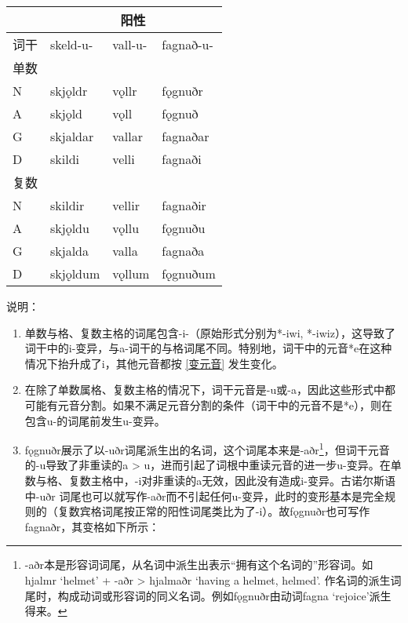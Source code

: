 \begin{longtable}{llll}
  \toprule
     & \multicolumn{3}{c}{\textbf{阳性}}                       \\
  \midrule
  \endhead
  \bottomrule
  \endfoot
  词干 & skeld-u-                        & vall-u- & fagnað-u- \\
  单数 &                                 &         &           \\
  N  & skjǫldr                         & vǫllr   & fǫgnuðr   \\
  A  & skjǫld                          & vǫll    & fǫgnuð    \\
  G  & skjaldar                        & vallar  & fagnaðar  \\
  D  & skildi                          & velli   & fagnaði   \\
  复数 &                                 &         &           \\
  N  & skildir                         & vellir  & fagnaðir  \\
  A  & skjǫldu                         & vǫllu   & fǫgnuðu   \\
  G  & skjalda                         & valla   & fagnaða   \\
  D  & skjǫldum                        & vǫllum  & fǫgnuðum  \\
\end{longtable}

说明：

\begin{enumerate}
  \item
        单数与格、复数主格的词尾包含-i-（原始形式分别为*-iwi, *-iwiz），这导致了词干中的i-变异，与a-词干的与格词尾不同。特别地，词干中的元音*e在这种情况下抬升成了i，其他元音都按 \ref{变元音} 发生变化。
  \item
        在除了单数属格、复数主格的情况下，词干元音是-u或-a，因此这些形式中都可能有元音分割。如果不满足元音分割的条件（词干中的元音不是*e），则在包含u-的词尾前发生u-变异。
  \item
        fǫgnuðr展示了以-uðr词尾派生出的名词，这个词尾本来是-aðr\footnote{-aðr本是形容词词尾，从名词中派生出表示``拥有这个名词的''形容词。如hjalmr
          `helmet' + -aðr > hjalmaðr `having a helmet, helmed'.
          作名词的派生词尾时，构成动词或形容词的同义名词。例如fǫgnuðr由动词fagna
          `rejoice'派生得来。}，但词干元音的-u导致了非重读的a
        >
        u，进而引起了词根中重读元音的进一步u-变异。在单数与格、复数主格中，-i对非重读的a无效，因此没有造成i-变异。古诺尔斯语中-uðr
        词尾也可以就写作-aðr而不引起任何u-变异，此时的变形基本是完全规则的（复数宾格词尾按正常的阳性词尾类比为了-i）。故fǫgnuðr也可写作fagnaðr，其变格如下所示：
\end{enumerate}

